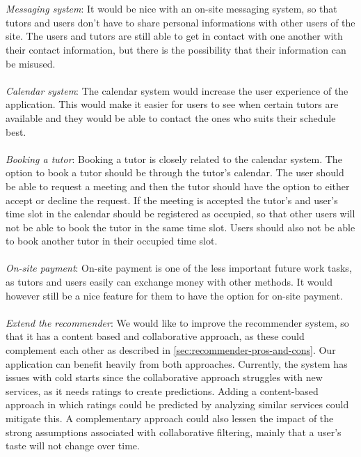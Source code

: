 \\\\
\textit{Messaging system}: 
It would be nice with an on-site messaging system, so that tutors and users don't have to share personal informations with other users of the site.
The users and tutors are still able to get in contact with one another with their contact information, but there is the possibility that their information can be misused.
\\\\
\textit{Calendar system}:
The calendar system would increase the user experience of the application. 
This would make it easier for users to see when certain tutors are available and they would be able to contact the ones who suits their schedule best.
\\\\
\textit{Booking a tutor}:
Booking a tutor is closely related to the calendar system.
The option to book a tutor should be through the tutor's calendar. 
The user should be able to request a meeting and then the tutor should have the option to either accept or decline the request.
If the meeting is accepted the tutor's and user's time slot in the calendar should be registered as occupied, so that other users will not be able to book the tutor in the same time slot.
Users should also not be able to book another tutor in their occupied time slot.
\\\\
\textit{On-site payment}:
On-site payment is one of the less important future work tasks, as tutors and users easily can exchange money with other methods.
It would however still be a nice feature for them to have the option for on-site payment.
\\\\
\textit{Extend the recommender}:
We would like to improve the recommender system, so that it has a content based and collaborative approach, as these could complement each other as described in \autoref{sec:recommender-pros-and-cons}.
Our application can benefit heavily from both approaches.
Currently, the system has issues with cold starts since the collaborative approach struggles with new services, as it needs ratings to create predictions.
Adding a content-based approach in which ratings could be predicted by analyzing similar services could mitigate this.
A complementary approach could also lessen the impact of the strong assumptions associated with collaborative filtering, mainly that a user's taste will not change over time.
